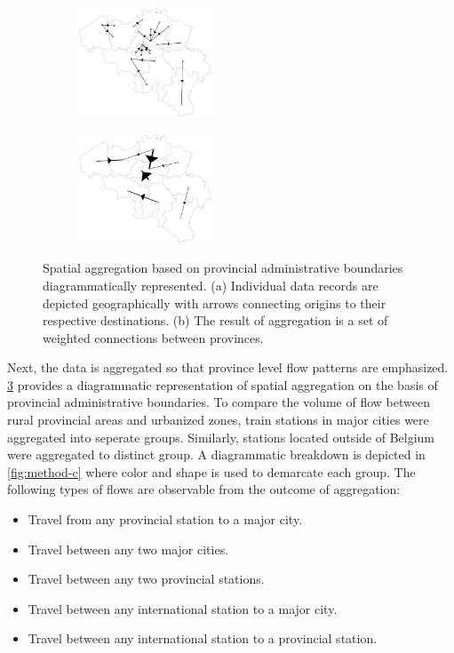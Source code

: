 \documentclass{sig-alternate}
\begin{document}
\begin{figure}[h]
  \centering
  \begin{subfigure}{.2375\textwidth}
    \includegraphics[width=4cm]{method-a.pdf}\\
    \subcaption{} %
    \label{fig:method-a}
  \end{subfigure}%
  \begin{subfigure}{.2375\textwidth}
    \includegraphics[width=4cm]{method-b.pdf}\\
    \subcaption{} %
    \label{fig:method-b}
  \end{subfigure}%
  \vspace{5.0pt}%
  \caption{Spatial aggregation based on provincial administrative boundaries diagrammatically represented. (a) Individual data records are depicted geographically with arrows connecting origins to their respective destinations. (b) The result of aggregation is a set of weighted connections between provinces.}
  \label{fig:method-ab}
\end{figure}

Next, the data is aggregated so that province level flow patterns are emphasized.
\cref{fig:method-ab} provides a diagrammatic representation of spatial aggregation on the basis of provincial administrative boundaries.
To compare the volume of flow between rural provincial areas and urbanized zones, train stations in major cities were aggregated into seperate groups. 
Similarly, stations located outside of Belgium were aggregated to distinct group. 
A diagrammatic breakdown is depicted in \cref{fig:method-c} where color and shape is used to demarcate each group.
The following types of flows are observable from the outcome of aggregation:

\begin{itemize}
  \item Travel from any provincial station to a major city.
  \item Travel between any two major cities.
  \item Travel between any two provincial stations.
  \item Travel between any international station to a major city.
  \item Travel between any international station to a provincial station.
\end{itemize}
\end{document}
